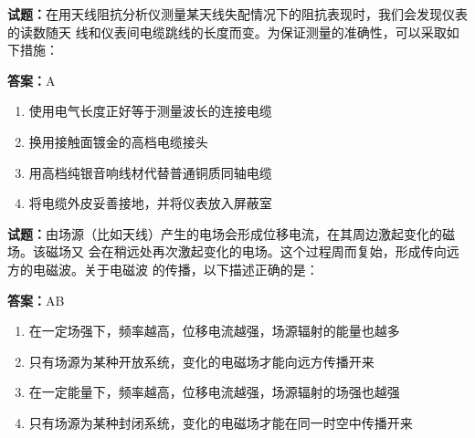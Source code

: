 \documentclass{ctexbook}
\begin{document}



\vspace{1em}

\textbf{试题：}在用天线阻抗分析仪测量某天线失配情况下的阻抗表现时，我们会发现仪表的读数随天
线和仪表间电缆跳线的长度而变。为保证测量的准确性，可以采取如下措施： 

\textbf{答案：}A 

\begin{enumerate}[leftmargin=3em]
  \item 使用电气长度正好等于测量波长的连接电缆 

  \item 换用接触面镀金的高档电缆接头 

  \item 用高档纯银音响线材代替普通铜质同轴电缆 

  \item 将电缆外皮妥善接地，并将仪表放入屏蔽室 

\end{enumerate}





\vspace{1em}

\textbf{试题：}由场源（比如天线）产生的电场会形成位移电流，在其周边激起变化的磁场。该磁场又
会在稍远处再次激起变化的电场。这个过程周而复始，形成传向远方的电磁波。关于电磁波
的传播，以下描述正确的是： 

\textbf{答案：}AB 

\begin{enumerate}[leftmargin=3em]
  \item 在一定场强下，频率越高，位移电流越强，场源辐射的能量也越多 

  \item 只有场源为某种开放系统，变化的电磁场才能向远方传播开来 

  \item 在一定能量下，频率越高，位移电流越强，场源辐射的场强也越强 

  \item 只有场源为某种封闭系统，变化的电磁场才能在同一时空中传播开来 

\end{enumerate}




\end{document}
